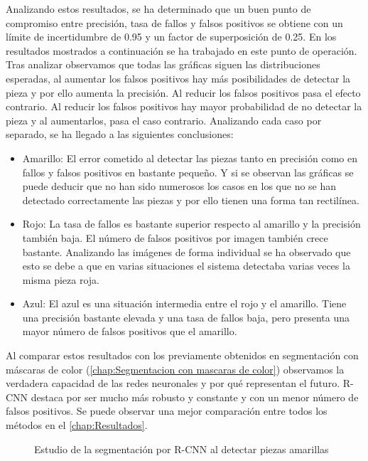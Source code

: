 Analizando estos resultados, se ha determinado que un buen punto de compromiso entre precisión, tasa de fallos y falsos positivos se obtiene con un límite de incertidumbre de 0.95 y un factor de superposición de 0.25. En los resultados mostrados a continuación se ha trabajado en este punto de operación. Tras analizar observamos que todas las gráficas siguen las distribuciones esperadas, al aumentar los falsos positivos hay más posibilidades de detectar la pieza y por ello aumenta la precisión. Al reducir los falsos positivos pasa el efecto contrario. Al reducir los falsos positivos hay mayor probabilidad de no detectar la pieza y al aumentarlos, pasa el caso contrario. Analizando cada caso por separado, se ha llegado a las siguientes conclusiones:
\begin{itemize}
\item Amarillo: El error cometido al detectar las piezas tanto en precisión como en fallos y falsos positivos en bastante pequeño. Y si se observan las gráficas se puede deducir que no han sido numerosos los casos en los que no se han detectado correctamente las piezas y por ello tienen una forma tan rectilínea.
\item Rojo: La tasa de fallos es bastante superior respecto al amarillo y la precisión también baja. El número de falsos positivos por imagen también crece bastante. Analizando las imágenes de forma individual se ha observado que esto se debe a que en varias situaciones el sistema detectaba varias veces la misma pieza roja.
\item Azul: El azul es una situación intermedia entre el rojo y el amarillo. Tiene una precisión bastante elevada y una tasa de fallos baja, pero presenta una mayor número de falsos positivos que el amarillo.
\end{itemize}

Al comparar estos resultados con los previamente obtenidos en segmentación con máscaras de color (\autoref{chap:Segmentacion con mascaras de color}) observamos la verdadera capacidad de las redes neuronales y por qué representan el futuro. R-CNN destaca por ser mucho más robusto y constante y con un menor número de falsos positivos. Se puede observar una mejor comparación entre todos los métodos en el \autoref{chap:Resultados}.


\begin{figure}[ht]  %
\vspace{-30pt}
  \hfill	
\vspace{-15pt}
\caption{Estudio de la segmentación por R-CNN al detectar piezas amarillas}
\label{fig:yellow R-CNN}
\end{figure}

